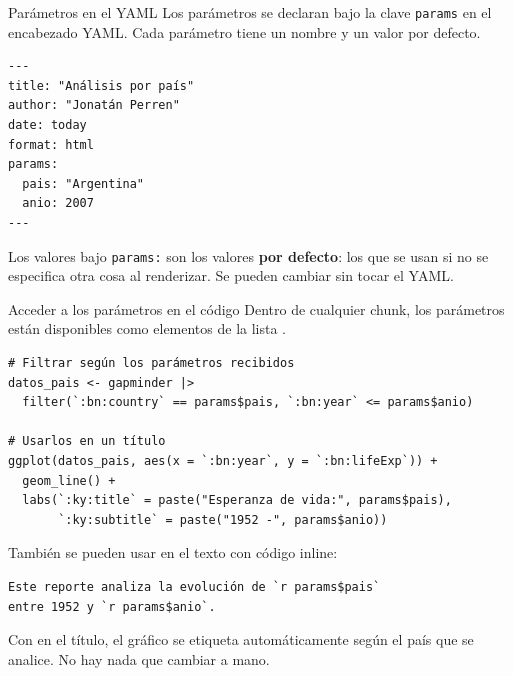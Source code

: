 \documentclass[8pt]{beamer}
\begin{document}
	\begin{frame}[fragile]{Parámetros en el YAML}
		Los parámetros se declaran bajo la clave \texttt{params} en el encabezado YAML. Cada parámetro tiene un nombre y un valor por defecto.

\begin{lstlisting}
---
title: "Análisis por país"
author: "Jonatán Perren"
date: today
format: html
params:
  pais: "Argentina"
  anio: 2007
---
\end{lstlisting}

		\begin{block}{}
			Los valores bajo \texttt{params:} son los valores \textbf{por defecto}: los que se usan si no se especifica otra cosa al renderizar. Se pueden cambiar sin tocar el YAML.
		\end{block}
	\end{frame}


	\begin{frame}[fragile]{Acceder a los parámetros en el código}
		Dentro de cualquier chunk, los parámetros están disponibles como elementos de la lista .

\begin{lstlisting}[style=RScript]
# Filtrar según los parámetros recibidos
datos_pais <- gapminder |>
  filter(`:bn:country` == params$pais, `:bn:year` <= params$anio)

# Usarlos en un título
ggplot(datos_pais, aes(x = `:bn:year`, y = `:bn:lifeExp`)) +
  geom_line() +
  labs(`:ky:title` = paste("Esperanza de vida:", params$pais),
       `:ky:subtitle` = paste("1952 -", params$anio))
\end{lstlisting}

		También se pueden usar en el texto con código inline:

\begin{lstlisting}
Este reporte analiza la evolución de `r params$pais`
entre 1952 y `r params$anio`.
\end{lstlisting}

		\begin{exampleblock}{}
			Con  en el título, el gráfico se etiqueta automáticamente según el país que se analice. No hay nada que cambiar a mano.
		\end{exampleblock}
	\end{frame}
\end{document}
